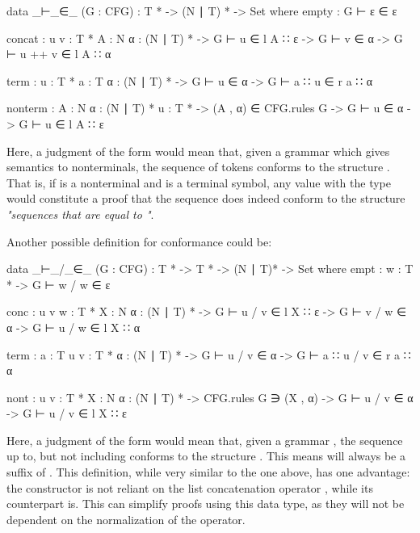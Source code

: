 	\begin{code}
	
		data _⊢_∈_ (G : CFG) :  T * -> (N ∣ T) * -> Set where
		  empty :
		    G ⊢ ε ∈ ε
		
		  concat : {u v : T *} {A : N} {α : (N ∣ T) *} ->
		    G ⊢ u ∈ l A ∷ ε -> G ⊢ v ∈ α -> G ⊢ u ++ v ∈ l A ∷ α
		
		  term : {u : T *} {a : T} {α : (N ∣ T) *} ->
		    G ⊢ u ∈ α -> G ⊢ a ∷ u ∈ r a ∷ α
		
		  nonterm : {A : N} {α : (N ∣ T) *} {u : T *} ->
		    (A , α) ∈ CFG.rules G -> G ⊢ u ∈ α -> G ⊢ u ∈ l A ∷ ε

	\end{code}

	Here, a judgment of the form  would mean that, given a
	grammar  which gives semantics to nonterminals, the sequence of
	tokens  conforms to the structure . That is, if
	 is a nonterminal and  is a terminal symbol, any value
	with the type  would constitute a proof
	that the sequence  does indeed conform to the structure
	\emph{"sequences that are equal to "}.

	Another possible definition for conformance could be: 

	\begin{code}
	
		data _⊢_/_∈_ (G : CFG) : T * -> T * -> (N ∣ T)* -> Set where
		  empt : {w : T *} ->
		    G ⊢ w / w ∈ ε
		
		  conc : {u v w : T *} {X : N} {α : (N ∣ T) *} ->
		    G ⊢ u / v ∈ l X ∷ ε ->
		    G ⊢ v / w ∈ α ->
		      G ⊢ u / w ∈ l X ∷ α
		
		  term : {a : T} {u v : T *} {α : (N ∣ T) *} ->
		    G ⊢ u / v ∈ α ->
		      G ⊢ a ∷ u / v ∈ r a ∷ α
		
		  nont : {u v : T *} {X : N} {α : (N ∣ T) *} ->
		    CFG.rules G ∋ (X , α) ->
		    G ⊢ u / v ∈ α ->
		    G ⊢ u / v ∈ l X ∷ ε

	\end{code}

	Here, a judgment of the form  would mean that, given
	a grammar , the sequence  up to, but not including
	 conforms to the structure . This means  will
	always be a suffix of . This definition, while very similar to
	the one above, has one advantage: the constructor  is not
	reliant on the list concatenation operator \codett{++}, while its
	counterpart  is. This can simplify proofs using this data
	type, as they will not be dependent on the normalization of the \codett{++}
	operator.

